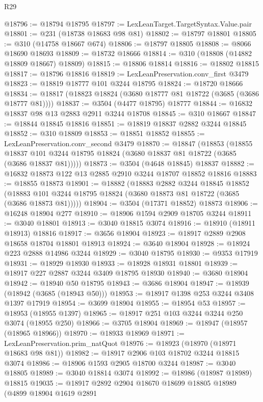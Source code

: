 \begin{lexlean}{R29}
\begin{coremodule}
@18796 := @18794 @18795
@18797 := LexLeanTarget.TargetSyntax.Value.pair
@18801 := @231 (@18738 @18683 @98 @81)
@18802 := @18797 @18801
@18805 := @310 (@14758 @18667 @674)
@18806 := @18797 @18805
@18808 := @8066 @18690 @18693
@18809 := @18732 @18666
@18814 := @310 (@18808 (@14882 @18809 @18667) @18809)
@18815 := @18806 @18814
@18816 := @18802 @18815
@18817 := @18796 @18816
@18819 := LexLeanPreservation.conv_first @3479
@18823 := @18819 @18777 @101 @3244 @18795
@18824 := @18720 @18666
@18834 := @18817 (@18823 @18824 (@3680 @18777 @81 @18722 (@3685 (@3686 @18777 @81))))
@18837 := @3504 (@4477 @18795) @18777
@18844 := @16832 @18837 @98 @13 @2883 @2911 @3244 @18708
@18845 := @310 @18667
@18847 := @18844 @18845 @18816
@18851 := @18819 @18837 @2882 @3244 @18845
@18852 := @310 @18809
@18853 := @18851 @18852
@18855 := LexLeanPreservation.conv_second @3479
@18870 := @18847
    (@18853
      (@18855 @18837 @101 @3244 @18795 @18824 (@3680 @18837 @81 @18722 (@3685 (@3686 @18837 @81)))))
@18873 := @3504 (@4648 @18845) @18837
@18882 := @16832 @18873 @122 @13 @2885 @2910 @3244 @18707 @18852 @18816
@18883 := @18855 @18873
@18901 := @18882
    (@18883
      @2882
      @3244
      @18845
      @18852
      (@18883 @101 @3244 @18795 @18824 (@3680 @18873 @81 @18722 (@3685 (@3686 @18873 @81)))))
@18904 := @3504 (@17371 @18852) @18873
@18906 := @16248 @18904 @277
@18910 := @18906 @1594 @2909 @18705 @3244
@18911 := @3040 @18801
@18913 := @3040 @18815 @3074
@18916 := @18910 (@18911 @18913) @18816
@18917 := @3656 @18904
@18923 := @18917 @2889 @2908 @18658 @18704 @18801 @18913
@18924 := @3640 @18904
@18928 := @18924 @223 @2888 @14986 @3244
@18929 := @3040 @18795
@18930 := @9353 @17919
@18931 := @18929 @18930
@18933 := @18928 @18931 @18801
@18939 := @18917 @227 @2887 @3244 @3409 @18795 @18930
@18940 := @3680 @18904
@18942 := @18940 @50 @18795
@18943 := @3686 @18904
@18947 := @18939 (@18942 (@3685 (@18943 @50)))
@18953 := @18917 @1398 @253 @3244 @3408 @1397 @17919
@18954 := @3699 @18904
@18955 := @18954 @53
@18957 := @18953 (@18955 @1397)
@18965 := @18917 @251 @103 @3244 @3244 @250 @3074 (@18955 @250)
@18966 := @3705 @18904
@18969 := @18947 (@18957 (@18965 @18966))
@18970 := @18933 @18969
@18971 := LexLeanPreservation.prim_natQuot
@18976 := @18923 (@18970 (@18971 @18683 @98 @81))
@18982 := @18917 @2906 @103 @18702 @3244 @18815 @3074
@18986 := @18906 @1593 @2905 @18700 @3244
@18987 := @3040 @18805
@18989 := @3040 @18814 @3074
@18992 := @18986 (@18987 @18989) @18815
@19035 := @18917
    @2892
    @2904
    @18670
    @18699
    @18805
    @18989
    (@4899
      @18904
      @1619
      @2891

\end{coremodule}
\end{lexlean}
